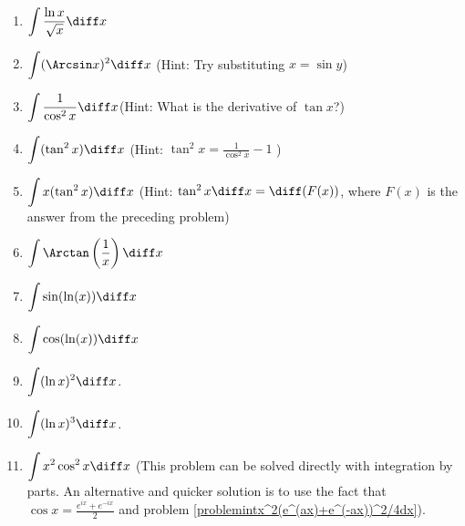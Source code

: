 \begin{multicols}{2}
\begin{enumerate}[ref={\fcProblemRef}]
\item $\displaystyle\int \frac{\ln x}{\sqrt{x}}\diff x $

\item \label{problemIntegrateArcsinSquared} $\displaystyle\int (\Arcsin x)^2 \diff x $ \quad \quad (Hint: Try substituting $x=\sin y$)


\item $\displaystyle\int \frac{1}{\cos^2 x}\diff x$\quad \quad (Hint: What is the derivative of $\tan x$?)

\item $\displaystyle\int (\tan^2 x) \diff x $ \quad \quad (Hint: $\tan^2 x = \frac{1}{\cos^2x }-1$ )


\item $\displaystyle\int x(\tan^2 x) \diff x $ \quad \quad (Hint: $\tan^2 x \diff x= \diff (F(x))$, where $F(x)$ is the answer from the preceding problem)
\item 
$\displaystyle
\int\Arctan \left(\frac{1}x\right)\diff x
$
\item \label{problemintsin(ln x)dx}

$\displaystyle\int \sin (\ln (x)) \diff x $

\item 
$\displaystyle\int \cos (\ln (x)) \diff x $


\item $\displaystyle\int (\ln x)^2 \diff x$.
\item $\displaystyle\int (\ln x)^3 \diff x$.
\item $\displaystyle\int x^2\cos^2x \diff x$ (This problem can be solved directly with integration by parts. An alternative and quicker solution is to use the fact that $\cos x= \frac{ e^{ix} + e^{-ix}}{2}$ and problem \ref{problemintx^2(e^(ax)+e^(-ax))^2/4dx}).
\end{enumerate}
\end{multicols}

